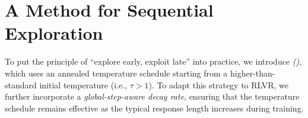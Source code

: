 \section{A Method for Sequential Exploration}
\label{sec: method}
To put the principle of ``explore early, exploit late'' into practice, we introduce \emph{\algname (\alg)}, 
which uses an annealed temperature schedule starting from a higher-than-standard initial temperature (i.e., $\tau>1$). 
%
To adapt this strategy to RLVR, we further incorporate a \emph{global-step-aware decay rate}, ensuring that the temperature schedule remains effective as the typical response length increases during training.
%


